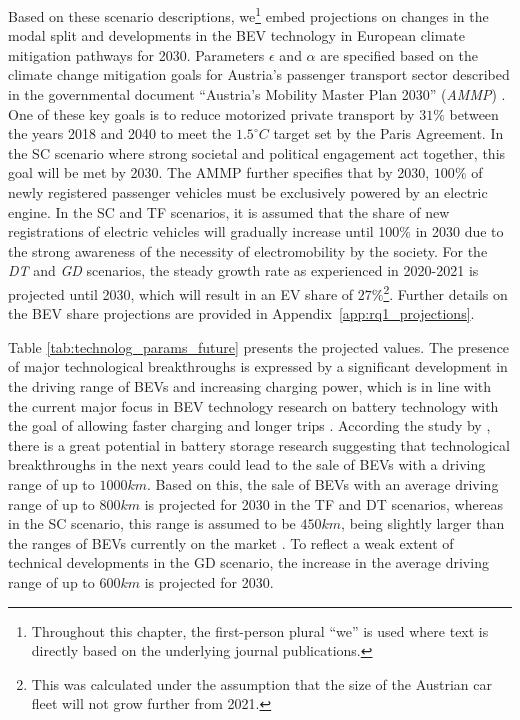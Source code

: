     
    Based on these scenario descriptions, we\footnote{Throughout this chapter, the first-person plural ``we'' is used where text is directly based on the underlying journal publications.} embed projections on changes in the modal split and developments in the \ac{BEV} technology in European climate mitigation pathways for 2030.
    Parameters $\epsilon$ and $\alpha$ are specified based on the climate change mitigation goals for Austria's passenger transport sector described in the governmental document \enquote{Austria's Mobility Master Plan 2030} (\textit{AMMP}) \citep{Nachhaltig}. One of these key goals is to reduce motorized private transport by $31\%$ between the years 2018 and 2040 to meet the $1.5^\circ C$ target set by the Paris Agreement. In the SC scenario where strong societal and political engagement act together, this goal will be met by 2030. The AMMP further specifies that by 2030, $100\%$ of newly registered passenger vehicles must be exclusively powered by an electric engine. In the SC and TF scenarios, it is assumed that the share of new registrations of electric vehicles will gradually increase until 100\% in 2030 due to the strong awareness of the necessity of electromobility by the society. For the \textit{DT} and \textit{GD} scenarios, the steady growth rate as experienced in 2020-2021 is projected until 2030, which will result in an EV share of $27\%$\footnote{This was calculated under the assumption that the size of the Austrian car fleet will not grow further from 2021.}. Further details on the BEV share projections are provided in Appendix~\ref{app:rq1_projections}.
    
    Table \ref{tab:technolog_params_future} presents the projected values. The presence of major technological breakthroughs is expressed by a significant development in the driving range of \acp{BEV} and increasing charging power, which is in line with the current major focus in \ac{BEV} technology research on battery technology with the goal of allowing faster charging and longer trips \citep{IRENA2019, Thielmann2020}. According  the study by \citet{Thielmann2020}, there is a great potential in battery storage research suggesting that technological breakthroughs in the next years could lead to the sale of \acp{BEV} with a driving range of up to $1000km$.  Based on this, the sale of \acp{BEV} with an average driving range of up to $800km$ is projected for 2030 in the TF and DT scenarios, whereas in the SC scenario, this range is assumed to be $450km$, being slightly larger than the ranges of \acp{BEV} currently on the market . To reflect a weak extent of technical developments in the GD scenario, the increase in the average driving range of up to $600km$ is projected for 2030.
    
